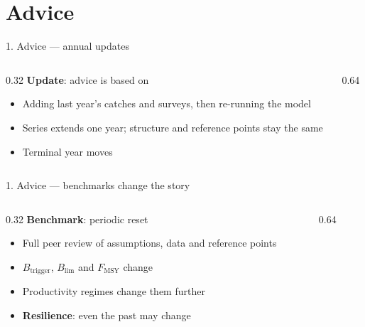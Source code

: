 \documentclass[12pt,aspectratio=169]{beamer}
\begin{document}
\section{Advice}

\begin{frame}{1. Advice --- annual updates}
  \begin{columns}[T]
    \begin{column}{0.32\textwidth}
      \footnotesize
      \textbf{Update}: advice is based on
      \vspace{1mm}
      \begin{itemize}
        \item Adding last year's catches and surveys, then re-running the model
        \item Series extends one year; structure and reference points stay the same
        \item Terminal year moves
      \end{itemize}
    \end{column}
    \begin{column}{0.64\textwidth}
      \centering
      \\
    \end{column}
  \end{columns}
\end{frame}

\begin{frame}{1. Advice --- benchmarks change the story}
  \begin{columns}[T]
    \begin{column}{0.32\textwidth}
      \footnotesize
      \textbf{Benchmark}: periodic reset
      \vspace{1mm}
      \begin{itemize}
        \item Full peer review of assumptions, data and reference points
        \item $B_{\mathrm{trigger}}$, $B_{\mathrm{lim}}$ and $F_{\mathrm{MSY}}$ change
        \item Productivity regimes change them further
        \item \textbf{Resilience}: even the past may change
      \end{itemize}
    \end{column}
    \begin{column}{0.64\textwidth}
      \centering
      \\
    \end{column}
  \end{columns}
\end{frame}
\end{document}

